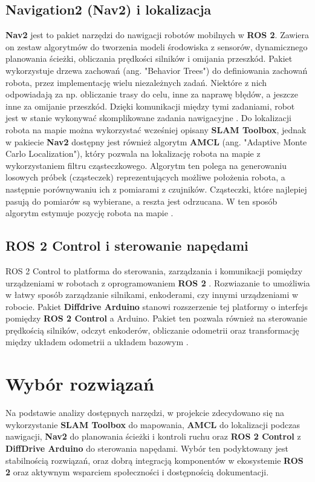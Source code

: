 \documentclass[a4paper,twoside,12pt]{book}
\begin{document}
\subsection{Navigation2 (Nav2) i lokalizacja}
\textbf{Nav2} jest to pakiet narzędzi do nawigacji robotów mobilnych w \textbf{ROS 2}. Zawiera on zestaw algorytmów do tworzenia modeli środowiska z sensorów, dynamicznego planowania ścieżki, obliczania prędkości silników i omijania przeszkód. 
Pakiet wykorzystuje drzewa zachowań (ang. "Behavior Trees") do definiowania zachowań robota, przez implementację wielu niezależnych zadań. Niektóre z nich odpowiadają za np. obliczanie trasy do celu, inne za naprawę błędów, a jeszcze inne za omijanie przeszkód. Dzięki komunikacji między tymi zadaniami, robot jest w stanie wykonywać skomplikowane zadania nawigacyjne 
\cite{bib:abs-2003-00368}.
\newline
\newline
Do lokalizacji robota na mapie można wykorzystać wcześniej opisany \textbf{SLAM Toolbox}, jednak w pakiecie \textbf{Nav2} dostępny jest również algorytm \textbf{AMCL} (ang. "Adaptive Monte Carlo Localization")\cite{bib:amcl}, który pozwala na lokalizację robota na mapie z wykorzystaniem filtru cząsteczkowego. Algorytm ten polega na generowaniu losowych próbek (cząsteczek) reprezentujących możliwe położenia robota, a następnie porównywaniu ich z pomiarami z czujników. Cząsteczki, które najlepiej pasują do pomiarów są wybierane, a reszta jest odrzucana. W ten sposób algorytm estymuje pozycję robota na mapie \cite{bib:amcl}.
\newpage
\subsection{ROS 2 Control i sterowanie napędami}
ROS 2 Control to platforma do sterowania, zarządzania i komunikacji pomiędzy urządzeniami w robotach z oprogramowaniem \textbf{ROS 2} \cite{bib:ros2control}. Rozwiazanie to umożliwia w łatwy sposób zarządzanie silnikami, enkoderami, czy innymi urządzeniami w robocie. Pakiet \textbf{Diffdrive Arduino} stanowi rozszerzenie tej platformy o interfejs pomiędzy \textbf{ROS 2 Control} a Arduino. Pakiet ten pozwala również na sterowanie prędkością silników, odczyt enkoderów, obliczanie odometrii oraz transformację między układem odometrii a układem bazowym \cite{bib:diffdrive}.
 

\section{Wybór rozwiązań}
Na podstawie analizy dostępnych narzędzi, w projekcie zdecydowano się na wykorzystanie \textbf{SLAM Toolbox} do mapowania, \textbf{AMCL} do lokalizacji podczas nawigacji, \textbf{Nav2} do planowania ścieżki i kontroli ruchu oraz \textbf{ROS 2 Control} z  \textbf{DiffDrive Arduino} do sterowania napędami. Wybór ten podyktowany jest stabilnością rozwiązań, oraz dobrą integracją komponentów w ekosystemie \textbf{ROS 2} oraz aktywnym wsparciem społeczności i dostępnością dokumentacji.
\end{document}
